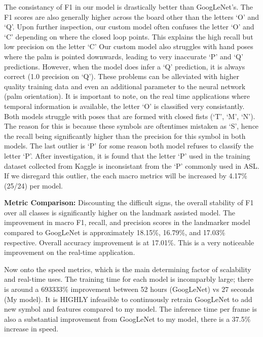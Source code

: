 \documentclass[11pt]{article}
\def\paraskip{\vskip 0.4cm}
\begin{document}
        The consistancy of F1 in our model is drastically better than GoogLeNet's. The F1 scores are also generally higher across the board other than the letters `O' and `Q'. Upon further inspection, our custom model often confuses the letter `O' and `C' depending on where the closed loop points. This explains the high recall but low precision on the letter `C' Our custom model also struggles with hand poses where the palm is pointed downwards, leading to very inaccurate `P' and `Q' predictions. However, when the model does infer a `Q' prediction, it is always correct (1.0 precision on `Q'). These problems can be alleviated with higher quality training data and even an additional parameter to the neural network (palm orientation). It is important to note, on the real time applications where temporal information is available, the letter `O' is classified very consistantly. Both models struggle with poses that are formed with closed fists (`T', `M', `N'). The reason for this is because these symbols are oftentimes mistaken as `S', hence the recall being significantly higher than the precision for this symbol in both models. The last outlier is `P' for some reason both model refuses to classify the letter `P'. After investigation, it is found that the letter `P' used in the training dataset collected from Kaggle is inconsistant from the `P' commonly used in ASL. If we disregard this outlier, the each macro metrics will be increased by 4.17\% (25/24) per model.

        \paraskip

        \noindent\textbf{Metric Comparison: } Discounting the difficult signs, the overall stability of F1 over all classes is significantly higher on the landmark assisted model. The improvement in macro F1, recall, and precision scores in the landmarker model compared to GoogLeNet is approximately 18.15\%, 16.79\%, and 17.03\% respective. Overall accuracy improvement is at 17.01\%. This is a very noticeable improvement on the real-time application. 

        Now onto the speed metrics, which is the main determining factor of scalability and real-time uses. The training time for each model is incomparbly large; there is around a 693333\% improvement between 52 hours (GoogLeNet) vs 27 seconds (My model). It is HIGHLY infeasible to continuously retrain GoogLeNet to add new symbol and features compared to my model. The inference time per frame is also a substantial improvement from GoogLeNet to my model, there is a 37.5\% increase in speed.
\end{document}
